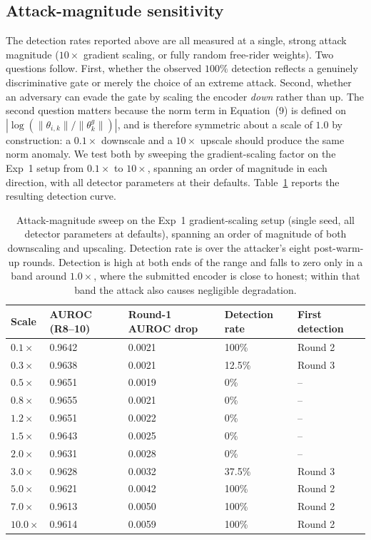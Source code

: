 \documentclass[pdflatex,sn-mathphys-num]{sn-jnl}
\begin{document}
\subsection{Attack-magnitude sensitivity}\label{sec:attack-magnitude}

The detection rates reported above are all measured at a single, strong attack magnitude ($10\times$ gradient scaling, or fully random free-rider weights). Two questions follow. First, whether the observed $100\%$ detection reflects a genuinely discriminative gate or merely the choice of an extreme attack. Second, whether an adversary can evade the gate by scaling the encoder \emph{down} rather than up. The second question matters because the norm term in Equation~(9) is defined on $\left|\log(\|\theta_{i,k}\|/\|\theta^g_k\|)\right|$, and is therefore symmetric about a scale of $1.0$ by construction: a $0.1\times$ downscale and a $10\times$ upscale should produce the same norm anomaly. We test both by sweeping the gradient-scaling factor on the Exp~1 setup from $0.1\times$ to $10\times$, spanning an order of magnitude in each direction, with all detector parameters at their defaults. Table~\ref{tab:attack-magnitude} reports the resulting detection curve.

\begin{table}[htbp]
\caption{Attack-magnitude sweep on the Exp~1 gradient-scaling setup (single seed, all detector parameters at defaults), spanning an order of magnitude of both downscaling and upscaling. Detection rate is over the attacker's eight post-warm-up rounds. Detection is high at both ends of the range and falls to zero only in a band around $1.0\times$, where the submitted encoder is close to honest; within that band the attack also causes negligible degradation.}
\label{tab:attack-magnitude}
\centering
\begin{tabular}{lllll}
\toprule
Scale & AUROC (R8--10) & Round-1 AUROC drop & Detection rate & First detection \\
\midrule
$0.1\times$ & 0.9642 & 0.0021 & 100\% & Round 2 \\
$0.3\times$ & 0.9638 & 0.0021 & 12.5\% & Round 3 \\
$0.5\times$ & 0.9651 & 0.0019 & 0\% & -- \\
$0.8\times$ & 0.9655 & 0.0021 & 0\% & -- \\
$1.2\times$ & 0.9651 & 0.0022 & 0\% & -- \\
$1.5\times$ & 0.9643 & 0.0025 & 0\% & -- \\
$2.0\times$ & 0.9631 & 0.0028 & 0\% & -- \\
$3.0\times$ & 0.9628 & 0.0032 & 37.5\% & Round 3 \\
$5.0\times$ & 0.9621 & 0.0042 & 100\% & Round 2 \\
$7.0\times$ & 0.9613 & 0.0050 & 100\% & Round 2 \\
$10.0\times$ & 0.9614 & 0.0059 & 100\% & Round 2 \\
\bottomrule
\end{tabular}
\end{table}
\end{document}
